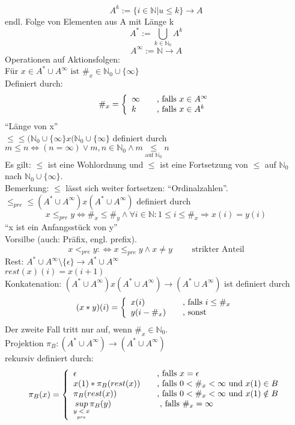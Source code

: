 \documentclass[a4paper,12pt]{scrartcl}
\begin{document}
$$A^k:=\{i\in\mathbb{N}|u\leq k\} \rightarrow A $$
endl. Folge von Elementen aus A mit Länge k
$$A^* := \bigcup_{k\in\mathbb{N}_0}A^k $$
$$A^\infty := \mathbb{N} \rightarrow A $$
Operationen auf Aktionsfolgen:\\
Für $x\in A^* \cup A^\infty \text{ ist } \#_x \in \mathbb{N}_0\cup\{\infty\}$\\
Definiert durch:
$$\#_x= \left\{ 
  \begin{array}{l l}
    \infty & \quad \text{, falls $x\in A^\infty$}\\
    k & \quad \text{, falls $x\in A^k$}
  \end{array} \right. $$
 "`Länge von x"'\\
 $\leq \leq(\mathbb{N}_0 \cup \{\infty\} x (\mathbb{N}_0\cup\{\infty\}$ definiert durch\\
 $m\leq n \Leftrightarrow (n=\infty) \vee m,n \in \mathbb{N}_0 \wedge m\underset{\text{auf }\mathbb{N}_0}{\leq} n $\\
 Es gilt: $\leq$ ist eine Wohlordnung und $\leq$ ist eine Fortsetzung von $\leq$ auf $\mathbb{N}_0$ nach $\mathbb{N}_0\cup\{\infty\}$.\\
 Bemerkung: $\leq$ lässt sich weiter fortsetzen: "`Ordinalzahlen"'.\\
 $\leq_{pre} \leq (A^* \cup A^\infty) x (A^* \cup A^\infty)$ definiert durch
 $$x\leq_{pre} y \Leftrightarrow \#_x \leq \#_y \wedge \forall i \in \mathbb{N}:1\leq i \leq \#_x \Rightarrow x(i)=y(i) $$
 "`x ist ein Anfangsstück von y"'\\
 Vorsilbe (auch: Präfix, engl. prefix).
 $$x<_{pre} y: \Leftrightarrow x \leq_{pre} y \wedge x \neq y \quad\quad\text{ strikter Anteil}$$
 Rest: $A^*\cup A^\infty \setminus \{\epsilon\} \rightarrow A^*\cup A^\infty$\\
 $rest(x)(i) = x(i+1)$\\
 Konkatenation: $(A^* \cup A^\infty) x (A^* \cup A^\infty) \rightarrow (A^* \cup A^\infty) $ ist definiert durch 
 $$(x*y)(i)= \left \{ 
  \begin{array}{l l}
    x(i) & \quad \text{, falls }i\leq \#_x\\
    y(i-\#_x)& \quad \text{, sonst}
  \end{array} \right. $$
 Der zweite Fall tritt nur auf, wenn $\#_x\in \mathbb{N}_0$.\\
 Projektion $\pi_B: (A^*\cup A^\infty) \rightarrow (A^* \cup A^\infty)$\\
 rekursiv definiert durch:
 $$\pi_B(x)= \left \{ 
  \begin{array}{l l l l}
    \epsilon & \quad \text{, falls }x=\epsilon\\
    x(1) * \pi_B(rest(x))  & \quad \text{, falls } 0<\#_x<\infty \text{ und } x(1)\in B\\
    \pi_B(rest(x)) & \quad \text{, falls } 0<\#_x<\infty \text{ und } x(1) \notin B\\
    \underset{y\underset{pre}{<} x}{sup}\pi_B(y) & \quad \text{ , falls } \#_x = \infty
  \end{array} \right. $$
 
\end{document}
